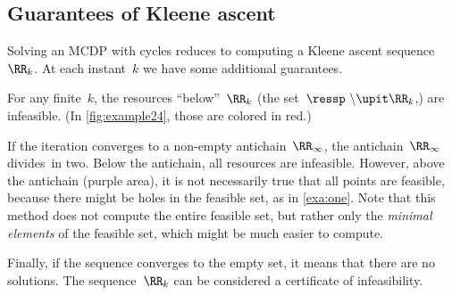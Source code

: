 \subsection{Guarantees of Kleene ascent}

Solving an MCDP with cycles reduces to computing a Kleene ascent sequence~$\RR_{k}$.
At each instant~$k$ we have some additional guarantees.

For any finite~$k$, the resources ``below''~$\RR_{k}$ (the set~$\ressp\ \backslash\upit\RR_{k}$,) are infeasible. (In \cref{fig:example24}, those are colored in red.)

If the iteration converges to a non-empty antichain~$\RR_{\infty}$, the antichain~$\RR_{\infty}$ divides~\ressp in two.
Below the antichain, all resources are infeasible.
However, above the antichain (purple area), it is not necessarily true that all points are feasible, because there might be holes in the feasible set, as in \cref{exa:one}.
Note that this method does not compute the entire feasible set, but rather only the \emph{minimal elements} of the feasible set, which might be much easier to compute.

Finally, if the sequence converges to the empty set, it means that there are no solutions.
The sequence~$\RR_{k}$ can be considered a certificate of infeasibility.
